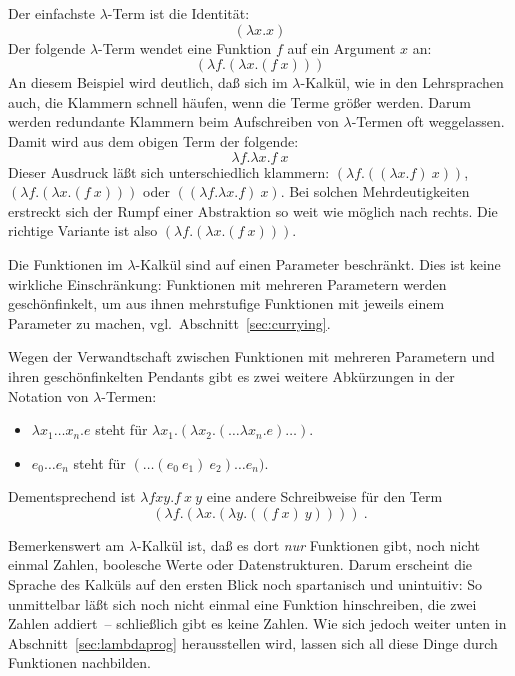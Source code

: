 Der einfachste $\lambda$-Term ist die Identität:
%
\begin{displaymath}
  (\lambda x.x)
\end{displaymath}
%
Der folgende $\lambda$-Term wendet eine Funktion $f$ auf ein Argument
$x$ an:
%
\begin{displaymath}
  (\lambda f.(\lambda x.(f~x)))
\end{displaymath}
%
An diesem Beispiel wird deutlich, daß sich im $\lambda$-Kalkül, wie
in den Lehrsprachen  auch, die Klammern schnell häufen, wenn die Terme größer
werden.  Darum werden redundante Klammern beim Aufschreiben von
$\lambda$-Termen oft weggelassen.  Damit wird aus dem obigen Term der
folgende:
%
\begin{displaymath}
  \lambda f.\lambda x.f~x
\end{displaymath}
%
Dieser Ausdruck läßt sich unterschiedlich
klammern: $(\lambda f.((\lambda x.f)~x))$, $(\lambda
f.(\lambda x.(f~x)))$ oder $((\lambda f.\lambda x.f)~x)$.  Bei
solchen Mehrdeutigkeiten 
erstreckt sich der Rumpf einer Abstraktion so weit wie möglich nach rechts.
Die richtige Variante ist also  $(\lambda
f.(\lambda x.(f~x)))$.

Die Funktionen im
$\lambda$-Kalkül sind auf einen Parameter
beschränkt.  Dies ist keine wirkliche
Einschränkung: Funktionen mit mehreren Parametern werden 
geschönfinkelt, um aus ihnen mehrstufige Funktionen mit jeweils einem
Parameter zu machen, vgl.\ Abschnitt~\ref{sec:currying}.

Wegen der Verwandtschaft zwischen Funktionen mit mehreren Parametern
und ihren geschönfinkelten Pendants gibt es zwei weitere Abkürzungen
in der Notation von $\lambda$-Termen:
%
\begin{itemize}
\item $\lambda x_1 \ldots x_n.e$ steht für $\lambda x_1.(\lambda
  x_2.(\ldots\lambda x_n.e)\ldots)$.
\item $e_0 \ldots e_n$ steht für $(\ldots(e_0~e_1)~e_2) \ldots e_n)$.
\end{itemize}
%
Dementsprechend ist $\lambda fxy.f~x~y$ eine andere Schreibweise für
den Term \[(\lambda f.(\lambda x.(\lambda y.((f~x)~y))))\ .\]

Bemerkenswert am $\lambda$-Kalkül ist, daß es dort \emph{nur}
Funktionen gibt, noch nicht einmal Zahlen, boolesche Werte oder
Datenstrukturen.  Darum erscheint die Sprache des Kalküls auf den
ersten Blick noch spartanisch und unintuitiv: So unmittelbar läßt sich
noch nicht einmal eine Funktion hinschreiben, die zwei Zahlen addiert~--
schließlich gibt es keine Zahlen.  Wie sich jedoch weiter unten in
Abschnitt~\ref{sec:lambdaprog} herausstellen wird, lassen sich all diese
Dinge durch Funktionen nachbilden.

